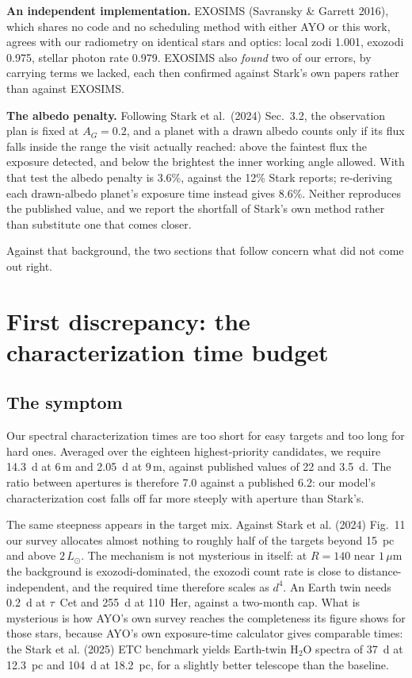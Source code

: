 \documentclass[11pt,a4paper]{article}
\begin{document}
\textbf{An independent implementation.} EXOSIMS (Savransky \& Garrett 2016), which shares no code and no
scheduling method with either AYO or this work, agrees with our radiometry on identical stars and
optics: local zodi 1.001, exozodi 0.975, stellar photon rate 0.979. EXOSIMS also \emph{found} two
of our errors, by carrying terms we lacked, each then confirmed against Stark's own papers rather
than against EXOSIMS.

\textbf{The albedo penalty.} Following Stark et al.\ (2024) Sec.~3.2, the observation plan is
fixed at $A_G = 0.2$, and a planet with a drawn albedo counts only if its flux falls inside the
range the visit actually reached: above the faintest flux the exposure detected, and below the
brightest the inner working angle allowed. With that test the albedo penalty is 3.6\%,
against the 12\% Stark reports; re-deriving each drawn-albedo planet's exposure time instead
gives 8.6\%. Neither reproduces the published value, and we report the shortfall
of Stark's own method rather than substitute one that comes closer.

Against that background, the two sections that follow concern what did not come out right.

\section{First discrepancy: the characterization time budget}
\label{sec:char}

\subsection{The symptom}

Our spectral characterization times are too short for easy targets and too long for hard ones.
Averaged over the eighteen highest-priority candidates, we require 14.3~d at $6\,$m and
2.05~d at $9\,$m, against published values of 22 and 3.5~d. The ratio between apertures
is therefore 7.0 against a published 6.2: our model's characterization cost falls off
far more steeply with aperture than Stark's.

The same steepness appears in the target mix. Against Stark et al. (2024) Fig.~11 our survey
allocates almost nothing to roughly half of the targets beyond 15~pc and above $2\,L_\odot$. The
mechanism is not mysterious in itself: at $R = 140$ near $1\,\mu$m the background is
exozodi-dominated, the exozodi count rate is close to distance-independent, and the required time
therefore scales as $d^4$. An Earth twin needs 0.2~d at $\tau$~Cet and 255~d at 110~Her, against a
two-month cap. What is mysterious is how AYO's own survey reaches the completeness its figure
shows for those stars, because AYO's own exposure-time calculator gives comparable times: the
Stark et al. (2025) ETC benchmark yields Earth-twin H$_2$O spectra of 37~d at 12.3~pc and 104~d at
18.2~pc, for a slightly better telescope than the baseline.
\end{document}
